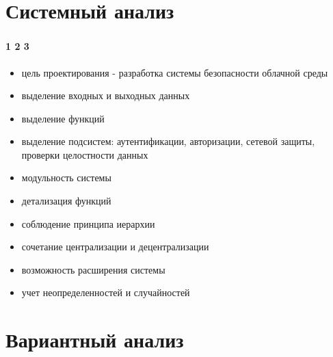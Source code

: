 
\section{Системный анализ}

\begin{frame}
\frametitle{\insertsection}
\framesubtitle{1 2 3}

\begin{itemize}
    \item цель проектирования - разработка системы безопасности облачной среды
    \item выделение входных и выходных данных
    \item выделение функций
    \item выделение подсистем: аутентификации, авторизации, сетевой защиты, проверки целостности данных
    \item модульность системы
    \item детализация функций
    \item соблюдение принципа иерархии
    \item сочетание централизации и децентрализации
    \item возможность расширения системы
    \item учет неопределенностей и случайностей
\end{itemize}
\end{frame}


\section{Вариантный анализ}


